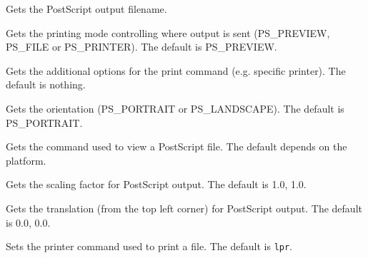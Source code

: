 \label{wxgetprinterfile}


Gets the PostScript output filename.


\label{wxgetprintermode}


Gets the printing mode controlling where output is sent (PS\_PREVIEW, PS\_FILE or PS\_PRINTER).
The default is PS\_PREVIEW.


\label{wxgetprinteroptions}


Gets the additional options for the print command (e.g. specific printer). The default is nothing.


\label{wxgetprinterorientation}


Gets the orientation (PS\_PORTRAIT or PS\_LANDSCAPE). The default is PS\_PORTRAIT.


\label{wxgetprinterpreviewcommand}


Gets the command used to view a PostScript file. The default depends on the platform.


\label{wxgetprinterscaling}


Gets the scaling factor for PostScript output. The default is 1.0, 1.0.


\label{wxgetprintertranslation}


Gets the translation (from the top left corner) for PostScript output. The default is 0.0, 0.0.


\label{wxsetprintercommand}


Sets the printer command used to print a file. The default is {\tt lpr}.


